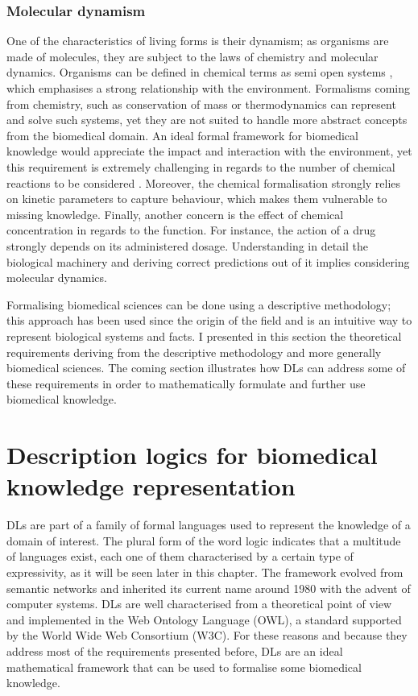 \subsubsection{Molecular dynamism}
\label{reqdyn}

One of the characteristics of living forms is their dynamism; as organisms are made of molecules, they are subject to the laws of chemistry and molecular dynamics. Organisms can be defined in chemical terms as semi open systems \citep{meng2004modeling}, which emphasises a strong relationship with the environment. Formalisms coming from chemistry, such as conservation of mass \citep{masswiki} or thermodynamics \citep{thermowiki} can represent and solve such systems, yet they are not suited to handle more abstract concepts from the biomedical domain. An ideal formal framework for biomedical knowledge would appreciate the impact and interaction with the environment, yet this requirement is extremely challenging in regards to the number of chemical reactions to be considered \citep{meng2004modeling}. Moreover, the chemical formalisation strongly relies on kinetic parameters to capture behaviour, which makes them vulnerable to missing knowledge. Finally, another concern is the effect of chemical concentration in regards to the function. For instance, the action of a drug strongly depends on its administered dosage. Understanding in detail the biological machinery and deriving correct predictions out of it implies considering molecular dynamics.

Formalising biomedical sciences can be done using a descriptive methodology; this approach has been used since the origin of the field and is an intuitive way to represent biological systems and facts. I presented in this section the theoretical requirements deriving from the descriptive methodology and more generally biomedical sciences. The coming section illustrates how DLs can address some of these requirements in order to mathematically formulate and further use biomedical knowledge.

\section{Description logics for biomedical knowledge representation}

DLs are part of a family of formal languages used to represent the knowledge of a domain of interest. The plural form of the word logic indicates that a multitude of languages exist, each one of them characterised by a certain type of expressivity, as it will be seen later in this chapter. The framework evolved from semantic networks \citep{allen1982s} and inherited its current name around 1980 with the advent of computer systems. DLs are well characterised from a theoretical point of view and implemented in the Web Ontology Language (OWL), a standard supported by the World Wide Web Consortium (W3C). For these reasons and because they address most of the requirements presented before, DLs are an ideal mathematical framework that can be used to formalise some biomedical knowledge.


